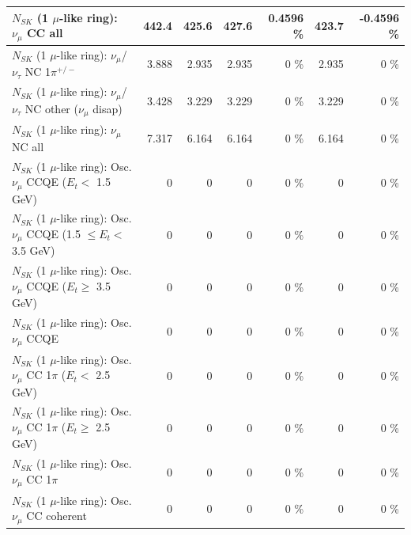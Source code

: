 \begin{table}
\begin{tabular}{| l | r | r | r  r | r  r |}
                                $N_{SK}$ (1 $\mu$-like ring): $\nu_{\mu}$ CC all &           442.4 &           425.6 &           427.6 &   0.4596 \%  &           423.7 &  -0.4596 \%  \\ 
\hline
              $N_{SK}$ (1 $\mu$-like ring): $\nu_\mu$/$\nu_\tau$ NC 1$\pi^{+/-}$ &           3.888 &           2.935 &           2.935 &        0 \%  &           2.935 &        0 \%  \\ 
   $N_{SK}$ (1 $\mu$-like ring): $\nu_\mu$/$\nu_\tau$ NC other ($\nu_\mu$ disap) &           3.428 &           3.229 &           3.229 &        0 \%  &           3.229 &        0 \%  \\ 
                                $N_{SK}$ (1 $\mu$-like ring): $\nu_{\mu}$ NC all &           7.317 &           6.164 &           6.164 &        0 \%  &           6.164 &        0 \%  \\ 
\hline
\hline
           $N_{SK}$ (1 $\mu$-like ring): Osc. $\nu_\mu$ CCQE ($E_{t} <$ 1.5 GeV) &               0 &               0 &               0 &        0 \%  &               0 &        0 \%  \\ 
  $N_{SK}$ (1 $\mu$-like ring): Osc. $\nu_\mu$ CCQE (1.5 $\leq E_{t} <$ 3.5 GeV) &               0 &               0 &               0 &        0 \%  &               0 &        0 \%  \\ 
        $N_{SK}$ (1 $\mu$-like ring): Osc. $\nu_\mu$ CCQE ($E_{t} \geq$ 3.5 GeV) &               0 &               0 &               0 &        0 \%  &               0 &        0 \%  \\ 
\hline
                               $N_{SK}$ (1 $\mu$-like ring): Osc. $\nu_\mu$ CCQE &               0 &               0 &               0 &        0 \%  &               0 &        0 \%  \\ 
\hline
      $N_{SK}$ (1 $\mu$-like ring): Osc. $\nu_\mu$ CC 1$\pi$ ($E_{t} <$ 2.5 GeV) &               0 &               0 &               0 &        0 \%  &               0 &        0 \%  \\ 
   $N_{SK}$ (1 $\mu$-like ring): Osc. $\nu_\mu$ CC 1$\pi$ ($E_{t} \geq$ 2.5 GeV) &               0 &               0 &               0 &        0 \%  &               0 &        0 \%  \\ 
\hline
                          $N_{SK}$ (1 $\mu$-like ring): Osc. $\nu_\mu$ CC 1$\pi$ &               0 &               0 &               0 &        0 \%  &               0 &        0 \%  \\ 
                        $N_{SK}$ (1 $\mu$-like ring): Osc. $\nu_\mu$ CC coherent &               0 &               0 &               0 &        0 \%  &               0 &        0 \%  \\ 

\end{tabular}
\end{table}
